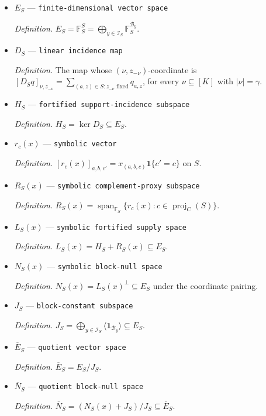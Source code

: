 \documentclass{article}
\begin{document}
\begin{itemize}
  \par\smallskip\noindent\emph{Definition.} \(\mathbb F_S=\mathbb Q(x_s:s\in S)\).
  \item \(E_S\) --- \texttt{finite-\allowbreak{}dimensional vector space}
  \par\smallskip\noindent\emph{Definition.} \(E_S=\mathbb F_S^S=\bigoplus_{y\in\mathcal I_S}\mathbb F_S^{\mathcal B_y}\).
  \item \(D_S\) --- \texttt{linear incidence map}
  \par\smallskip\noindent\emph{Definition.} The map whose \((\nu,z_{-\nu})\)-coordinate is \([D_Sq]_{\nu,z_{-\nu}}=\sum_{(a,z)\in S:z_{-\nu}\text{ fixed}}q_{a,z}\), for every \(\nu\subseteq[K]\) with \(|\nu|=\gamma\).
  \item \(H_S\) --- \texttt{fortified support-\allowbreak{}incidence subspace}
  \par\smallskip\noindent\emph{Definition.} \(H_S=\ker D_S\subseteq E_S\).
  \item \(r_c(x)\) --- \texttt{symbolic vector}
  \par\smallskip\noindent\emph{Definition.} \([r_c(x)]_{a,b,c'}=x_{(a,b,c)}\mathbf 1\{c'=c\}\) on \(S\).
  \item \(R_S(x)\) --- \texttt{symbolic complement-\allowbreak{}proxy subspace}
  \par\smallskip\noindent\emph{Definition.} \(R_S(x)=\operatorname{span}_{\mathbb F_S}\{r_c(x):c\in\operatorname{proj}_C(S)\}\).
  \item \(L_S(x)\) --- \texttt{symbolic fortified supply space}
  \par\smallskip\noindent\emph{Definition.} \(L_S(x)=H_S+R_S(x)\subseteq E_S\).
  \item \(N_S(x)\) --- \texttt{symbolic block-\allowbreak{}null space}
  \par\smallskip\noindent\emph{Definition.} \(N_S(x)=L_S(x)^\perp\subseteq E_S\) under the coordinate pairing.
  \item \(J_S\) --- \texttt{block-\allowbreak{}constant subspace}
  \par\smallskip\noindent\emph{Definition.} \(J_S=\bigoplus_{y\in\mathcal I_S}\langle\mathbf 1_{\mathcal B_y}\rangle\subseteq E_S\).
  \item \(\overline E_S\) --- \texttt{quotient vector space}
  \par\smallskip\noindent\emph{Definition.} \(\overline E_S=E_S/J_S\).
  \item \(\overline N_S\) --- \texttt{quotient block-\allowbreak{}null space}
  \par\smallskip\noindent\emph{Definition.} \(\overline N_S=(N_S(x)+J_S)/J_S\subseteq\overline E_S\).

\end{itemize}
\end{document}
